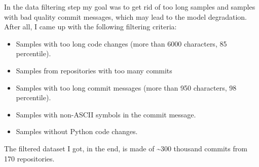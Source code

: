 In the data filtering step my goal was to get rid of too long samples and samples with bad quality commit messages, which may lead to the model degradation. After all, I came up with the following filtering criteria: 
\begin{itemize}
    \item Samples with too long code changes (more than 6000 characters, 85 percentile).
    \item Samples from repositories with too many commits
    \item Samples with too long commit messages (more than 950 characters, 98 percentile).
    \item Samples with non-ASCII symbols in the commit message.
    \item Samples without Python code changes.
\end{itemize}
The filtered dataset I got, in the end, is made of \textasciitilde{}300 thousand commits from 170 repositories. 

